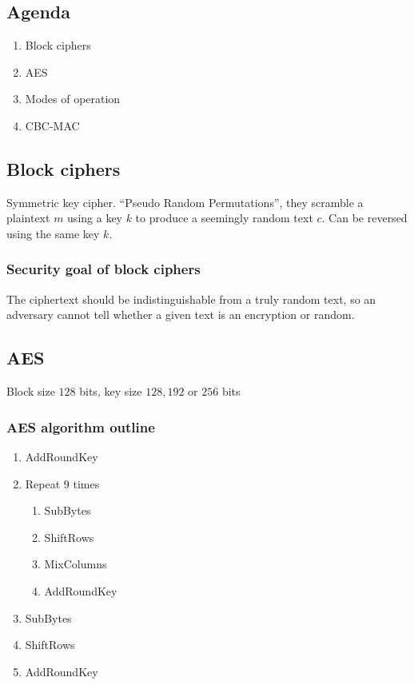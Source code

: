 

\subsection*{Agenda}
\begin{enumerate}
\item Block ciphers
\item AES
\item Modes of operation
\item CBC-MAC
\end{enumerate}

\subsection{Block ciphers}

Symmetric key cipher. ``Pseudo Random Permutations'', they scramble a
plaintext $m$ using a key $k$ to produce a seemingly random text
$c$. Can be reversed using the same key $k$.

\subsubsection*{Security goal of block ciphers}

The ciphertext should be indistinguishable from a truly random text,
so an adversary cannot tell whether a given text is an encryption or
random.

\subsection{AES}
Block size $128$ bits, key size $128, 192$ or $256$ bits

\subsubsection*{AES algorithm outline}

\begin{enumerate}
\item AddRoundKey
\item Repeat 9 times
  \begin{enumerate}
  \item SubBytes
  \item ShiftRows
  \item MixColumns
  \item AddRoundKey
  \end{enumerate}
\item SubBytes
\item ShiftRows
\item AddRoundKey
\end{enumerate}

